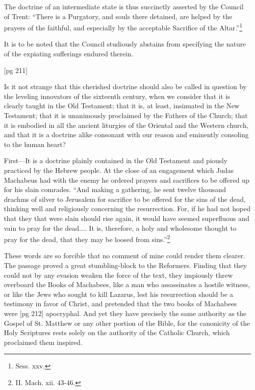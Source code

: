 The doctrine of an intermediate state is thus
succinctly asserted by the Council of Trent: “There
is a Purgatory, and souls there detained, are helped
by the prayers of the faithful, and especially by the
acceptable Sacrifice of the Altar.”\footnote{Sess. xxv.}

It is to be noted that the Council studiously abstains
from specifying the nature of the expiating
sufferings endured therein.

[pg 211]

Is it not strange that this cherished doctrine
should also be called in question by the leveling
innovators of the sixteenth century, when we consider
that it is clearly taught in the Old Testament;
that it is, at least, insinuated in the New Testament;
that it is unanimously proclaimed by the
Fathers of the Church; that it is embodied in all
the ancient liturgies of the Oriental and the Western
church, and that it is a doctrine alike consonant
with our reason and eminently consoling to
the human heart?

First—It is a doctrine plainly contained in the
Old Testament and piously practiced by the Hebrew
people. At the close of an engagement which
Judas Machabeus had with the enemy he ordered
prayers and sacrifices to be offered up for his slain
comrades. “And making a gathering, he sent
twelve thousand drachms of silver to Jerusalem
for sacrifice to be offered for the sins of the dead,
thinking well and religiously concerning the resurrection.
For, if he had not hoped that they that
were slain should rise again, it would have seemed
superfluous and vain to pray for the dead.... It
is, therefore, a holy and wholesome thought to pray
for the dead, that they may be loosed from sins.”\footnote{II.
Mach. xii. 43-46.}

These words are so forcible that no comment of
mine could render them clearer. The passage
proved a great stumbling-block to the Reformers.
Finding that they could not by any evasion weaken
the force of the text, they impiously threw overboard
the Books of Machabees, like a man who
assassinates a hostile witness, or like the Jews
who sought to kill Lazarus, lest his resurrection
should be a testimony in favor of Christ, and pretended
that the two books of Machabees were
[pg 212]
apocryphal. And yet they have precisely the same
authority as the Gospel of St. Matthew or any other
portion of the Bible, for the canonicity of the Holy
Scriptures rests solely on the authority of the
Catholic Church, which proclaimed them inspired.

